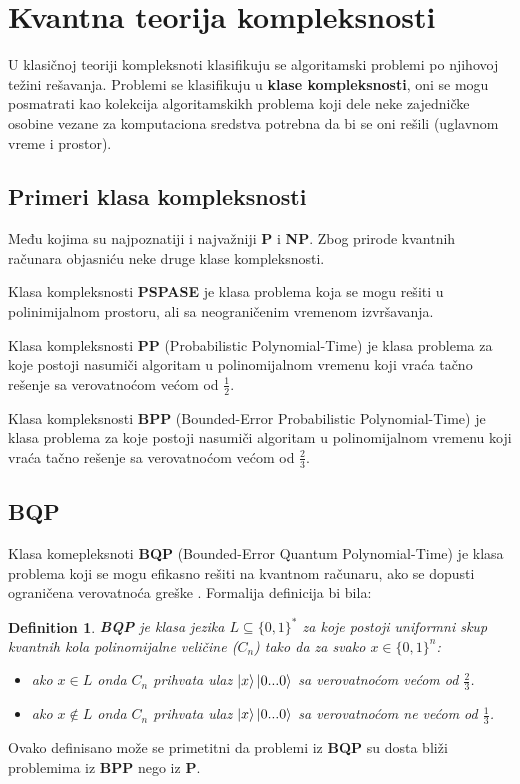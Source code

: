 \documentclass[12pt, letterpaper, oneside]{article}
\newtheorem{definition}{Definition}
\begin{document}
\section{Kvantna teorija kompleksnosti}
U klasičnoj teoriji kompleksnoti klasifikuju se algoritamski problemi po njihovoj težini rešavanja.
Problemi se klasifikuju u \textbf{klase kompleksnosti}, oni se mogu posmatrati kao kolekcija algoritamskikh problema koji dele neke zajedničke osobine
vezane za komputaciona sredstva potrebna da bi se oni rešili (uglavnom vreme i prostor). \cite{nielsen_chuang_10th}\\

\subsection{Primeri klasa kompleksnosti}
Među kojima su najpoznatiji i najvažniji \textbf{P} i \textbf{NP}. Zbog prirode kvantnih računara objasniću neke druge klase kompleksnosti.

Klasa kompleksnosti \textbf{PSPASE} je klasa problema koja se mogu rešiti u polinimijalnom prostoru, ali sa neograničenim vremenom izvršavanja.


Klasa kompleksnosti \textbf{PP} (Probabilistic Polynomial-Time) je klasa problema za koje postoji nasumiči algoritam u polinomijalnom vremenu koji vraća
tačno rešenje sa verovatnoćom većom od $\frac{1}{2}$.

Klasa kompleksnosti \textbf{BPP} (Bounded-Error Probabilistic Polynomial-Time) je klasa problema za koje postoji nasumiči algoritam u polinomijalnom vremenu koji vraća
tačno rešenje sa verovatnoćom većom od $\frac{2}{3}$. \cite{aaronson2013quantum}
\subsection{BQP}
Klasa komepleksnoti \textbf{BQP} (Bounded-Error Quantum Polynomial-Time) je klasa problema koji se mogu efikasno rešiti na kvantnom računaru, ako se dopusti ograničena verovatnoća greške \cite{nielsen_chuang_10th}.
Formalija definicija bi bila:\cite{aaronson2013quantum}
\begin{definition}
    \textbf{BQP} je klasa jezika $L \subseteq \{0,1\}^{*}$ za koje postoji uniformni skup kvantnih kola polinomijalne veličine ($C_n$)
    tako da za svako $x \in \{0,1\}^{n}$:
    \begin{itemize}
        \item ako $x \in L$ onda $C_n$ prihvata ulaz $\Ket{x}\Ket{0...0}$ sa verovatnoćom većom od $\frac{2}{3}$.
        \item ako $x \notin L$ onda $C_n$ prihvata ulaz $\Ket{x}\Ket{0...0}$ sa verovatnoćom ne većom od $\frac{1}{3}$.
    \end{itemize} 
\end{definition}
Ovako definisano može se primetitni da problemi iz \textbf{BQP} su dosta bliži problemima iz \textbf{BPP} nego iz \textbf{P}.
\end{document}
